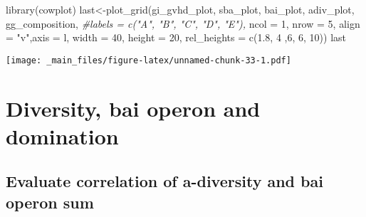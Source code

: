 \documentclass[
]{book}
\newenvironment{Shaded}{\begin{snugshade}}{\end{snugshade}}
\newcommand{\AttributeTok}[1]{\textcolor[rgb]{0.77,0.63,0.00}{#1}}
\newcommand{\CommentTok}[1]{\textcolor[rgb]{0.56,0.35,0.01}{\textit{#1}}}
\newcommand{\DecValTok}[1]{\textcolor[rgb]{0.00,0.00,0.81}{#1}}
\newcommand{\FloatTok}[1]{\textcolor[rgb]{0.00,0.00,0.81}{#1}}
\newcommand{\FunctionTok}[1]{\textcolor[rgb]{0.00,0.00,0.00}{#1}}
\newcommand{\NormalTok}[1]{#1}
\newcommand{\OtherTok}[1]{\textcolor[rgb]{0.56,0.35,0.01}{#1}}
\newcommand{\StringTok}[1]{\textcolor[rgb]{0.31,0.60,0.02}{#1}}
\begin{document}
\begin{Shaded}
\begin{Highlighting}[]
\FunctionTok{library}\NormalTok{(cowplot)}
\NormalTok{last}\OtherTok{\textless{}{-}}\FunctionTok{plot\_grid}\NormalTok{(gi\_gvhd\_plot, sba\_plot, bai\_plot, adiv\_plot, gg\_composition, }
          \CommentTok{\#labels = c("A", "B", "C", "D", "E"),}
          \AttributeTok{ncol =} \DecValTok{1}\NormalTok{, }\AttributeTok{nrow =} \DecValTok{5}\NormalTok{,}
          \AttributeTok{align =} \StringTok{"v"}\NormalTok{,}\AttributeTok{axis =} \StringTok{\textquotesingle{}l\textquotesingle{}}\NormalTok{,}
          \AttributeTok{width =} \DecValTok{40}\NormalTok{, }\AttributeTok{height =} \DecValTok{20}\NormalTok{,}
          \AttributeTok{rel\_heights =} \FunctionTok{c}\NormalTok{(}\FloatTok{1.8}\NormalTok{, }\DecValTok{4}\NormalTok{ ,}\DecValTok{6}\NormalTok{, }\DecValTok{6}\NormalTok{, }\DecValTok{10}\NormalTok{))}
\NormalTok{last}
\end{Highlighting}
\end{Shaded}

\texttt{[image: \_main\_files/figure-latex/unnamed-chunk-33-1.pdf]}

\hypertarget{diversity-bai-operon-and-domination}{%
\chapter{Diversity, bai operon and domination}\label{diversity-bai-operon-and-domination}}

\hypertarget{evaluate-correlation-of-a-diversity-and-bai-operon-sum}{%
\section{Evaluate correlation of a-diversity and bai operon sum}\label{evaluate-correlation-of-a-diversity-and-bai-operon-sum}}
\end{document}
